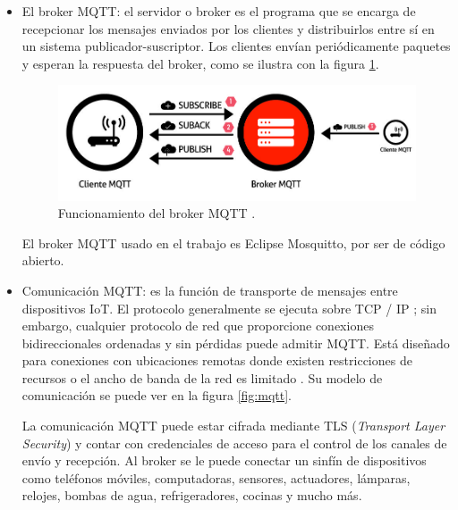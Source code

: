 \begin{itemize}
\item El broker MQTT: el servidor o broker es el programa que se encarga de recepcionar los mensajes enviados por los clientes y distribuirlos entre sí en un sistema publicador-suscriptor. Los clientes envían periódicamente paquetes y esperan la respuesta del broker, como se ilustra con la figura \ref{fig:broker}. 

\begin{figure}[htbp]
	\centering
	\includegraphics[width=.75\textwidth]{./Figures/broker.jpg}
	\caption{Funcionamiento del broker MQTT \protect\footnotemark.}

	\label{fig:broker}
\end{figure}


El broker MQTT usado en el trabajo es Eclipse Mosquitto, por ser de código abierto.

\item Comunicación MQTT: es la función de transporte de mensajes entre dispositivos IoT. El protocolo generalmente se ejecuta sobre TCP / IP ; sin embargo, cualquier protocolo de red que proporcione conexiones bidireccionales ordenadas y sin pérdidas puede admitir MQTT. Está diseñado para conexiones con ubicaciones remotas donde existen restricciones de recursos o el ancho de banda de la red es limitado \citep{WEBSITE:3}. Su modelo de comunicación se puede ver en la figura \ref{fig:mqtt}.




La comunicación MQTT puede estar cifrada mediante TLS (\emph{Transport Layer Security}) y contar con credenciales de acceso para el control de los canales de envío y recepción. Al broker se le puede conectar un sinfín de dispositivos como teléfonos móviles, computadoras, sensores, actuadores, lámparas, relojes, bombas de agua, refrigeradores, cocinas y mucho más. 


\end{itemize}
